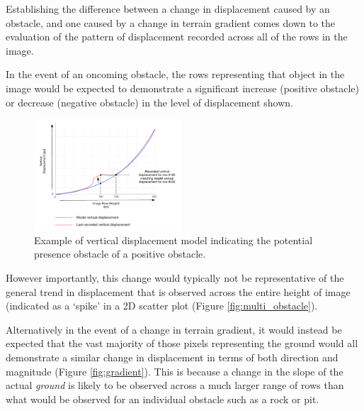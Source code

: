   
 Establishing the difference between a change in displacement caused by an obstacle, and one caused by a change in terrain gradient comes down to the evaluation of the pattern of displacement recorded across all of the rows in the image.
 
 In the event of an oncoming obstacle, the rows representing that object in the image would be expected to demonstrate a significant increase (positive obstacle) or decrease (negative obstacle) in the level of displacement shown. 

\clearpage
\begin{figure}
\vspace{-20pt}
  \begin{center}
    \includegraphics[width=0.49\textwidth]{images/obstacle_graph.pdf}
  \end{center}
  \vspace{-10pt}
  \caption{Example of vertical displacement model indicating the potential presence obstacle of a positive obstacle.}
  \label{fig:obstacle}
  \vspace{20pt}
\end{figure}

However importantly, this change would typically not be representative of the general trend in displacement that is observed across the entire height of image (indicated as a `spike' in a 2D scatter plot (Figure \ref{fig:multi_obstacle}). 

 Alternatively in the event of a change in terrain gradient, it would instead be expected that the vast majority of those pixels representing the ground would all demonstrate a similar change in displacement in terms of both direction and magnitude (Figure \ref{fig:gradient}). This is because a change in the slope of the actual \textit{ground} is likely to be observed across a much larger range of rows than what would be observed for an individual obstacle such as a rock or pit.

